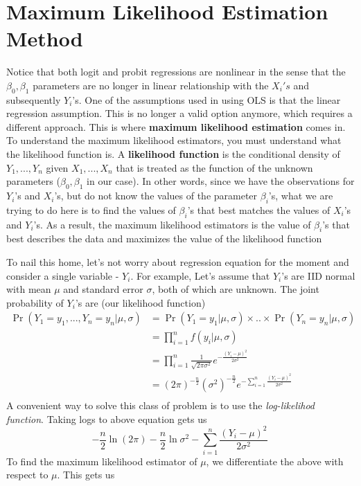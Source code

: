 \section{Maximum Likelihood Estimation Method}
Notice that both logit and probit regressions are nonlinear in the sense that the $\beta_0, \beta_1$ parameters are no longer in linear relationship with the $X_i's$ and subsequently $Y_i$'s. One of the assumptions used in using OLS is that the linear regression assumption. This is no longer a valid option anymore, which requires a different approach. This is where \textbf{maximum likelihood estimation} comes in. To understand the maximum likelihood estimators, you must understand what the likelihood function is. A \textbf{likelihood function} is the conditional density of $Y_1,...,Y_n$ given $X_1,...,X_n$ that is treated as the function of the unknown parameters ($\beta_0, \beta_1$ in our case). In other words, since we have the observations for $Y_i$'s and $X_i$'s, but do  not know the values of the parameter $\beta_i$'s, what we are trying to do here is to find the values of $\beta_i$'s that best matches the values of $X_i$'s and $Y_i$'s. As a result, the maximum likelihood estimators is the value of $\beta_i$'s that best describes the data and maximizes the value of the likelihood function \par\medskip
To nail this home, let's not worry about regression equation for the moment and consider a single variable - $Y_i$. For example, Let's assume that $Y_i$'s are IID normal with mean $\mu$ and standard error $\sigma$, both of which are unknown. The joint probability of $Y_i$'s are (our likelihood function)
\[
\begin{aligned}
\Pr(Y_1=y_1,...,Y_n=y_n|\mu,\sigma)&=\Pr(Y_1 = y_1|\mu,\sigma)\times..\times\Pr(Y_n=y_n|\mu,\sigma)\\
&=\prod_{i=1}^nf(y_i|\mu,\sigma)\\
&=\prod_{i=1}^n\frac{1}{\sqrt{2\pi\sigma^2}}e^{-\frac{(Y_i-\mu)^2}{2\sigma^2}}\\
&=(2\pi)^{-\frac{n}{2}} (\sigma^2)^{-\frac{n}{2}}e^{-\sum_{i=1}^n\frac{(Y_i-\mu)^2}{2\sigma^2}}\\
\end{aligned}
\]
A convenient way to solve this class of problem is to use the \textit{log-likelihod function}. Taking logs to above equation gets us
\[
-\frac{n}{2}\ln{(2\pi)}-\frac{n}{2}\ln{\sigma^2}-\sum_{i=1}^n\frac{(Y_i-\mu)^2}{2\sigma^2} \ \tag{*}
\]
To find the maximum likelihood estimator of $\mu$, we differentiate the above with respect to $\mu$. This gets us
